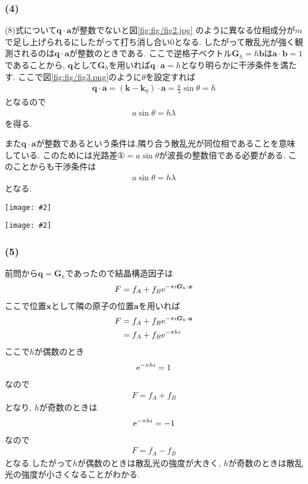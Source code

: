 \documentclass[uplatex,a4j,11pt,dvipdfmx]{jsarticle}
\makeatletter
\def\fgcaption{\def\@captype{figure}\caption}
\newcommand{\mfig}[3][width=15cm]{
\begin{center}
\texttt{[image: \#2]}
\fgcaption{#3 \label{fig:#2}}
\end{center}
}
\makeatother
\begin{document}
\subsubsection*{(4)}
(8)式について${\bm q}\cdot{\bm a}$が整数でないと図\ref{fig:fig/fig2.jpg}
のように異なる位相成分が$m$で足し上げられるにしたがって打ち消し合い$0$となる.
したがって散乱光が強く観測されるのは${\bm q}\cdot{\bm a}$が整数のときである.
ここで逆格子ベクトル${\bm G}_h=h{\bm b}$は${\bm a}\cdot{\bm b}=1$であることから,
$\bm q$として${\bm G}_h$を用いれば${\bm q}\cdot{\bm a}=h$となり明らかに干渉条件を満たす.
ここで図\ref{fig:fig/fig3.png}のように$\theta$を設定すれば
\begin{align}
  {\bm q}\cdot{\bm a}=({\bm k}-{\bm k}_0)\cdot{\bm a}=\frac{a}{\lambda}\sin\theta=h
\end{align}
となるので
\begin{align}
  a\sin\theta=h\lambda
\end{align}
を得る.

また${\bm q}\cdot{\bm a}$が整数であるという条件は,隣り合う散乱光が同位相であることを意味している.
このためには光路差$①=a\sin\theta$が波長の整数倍である必要がある.
このことからも干渉条件は
\begin{align}
  a\sin\theta=h\lambda
\end{align}
となる.
\mfig[width=6cm]{fig/fig2.jpg}{異なる位相成分の打ち消し合い}
\mfig[width=6cm]{fig/fig3.png}{$\theta$の設定(問題から引用)}
\subsubsection*{(5)}
前問から${\bm q}={\bm G}_h$であったので結晶構造因子は
\begin{align}
  F=f_A+f_B{\rm e}^{-\pi i{\bm G}_h\cdot {\bm x}}
\end{align}
ここで位置$\bm x$として隣の原子の位置$\bm a$を用いれば
\begin{align}
  \begin{split}
    F&=f_A+f_B{\rm e}^{-\pi i{\bm G}_h\cdot {\bm a}}\\
    &=f_A+f_B{\rm e}^{-\pi hi}
  \end{split}
\end{align}
ここで$h$が偶数のとき
\begin{align}
  {\rm e}^{-\pi hi}=1
\end{align}
なので
\begin{align}
  F=f_A+f_B
\end{align}
となり, $h$が奇数のときは
\begin{align}
  {\rm e}^{-\pi hi}=-1
\end{align}
なので
\begin{align}
  F=f_A-f_B
\end{align}
となる.したがって$h$が偶数のときは散乱光の強度が大きく,
$h$が奇数のときは散乱光の強度が小さくなることがわかる.
\end{document}
